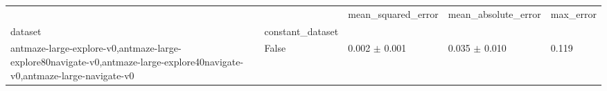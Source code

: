 \begin{tabular}{lllll}
\toprule
 &  & mean_squared_error & mean_absolute_error & max_error \\
dataset & constant_dataset &  &  &  \\
\midrule
antmaze-large-explore-v0,antmaze-large-explore80navigate-v0,antmaze-large-explore40navigate-v0,antmaze-large-navigate-v0 & False & 0.002 $\pm$ 0.001 & 0.035 $\pm$ 0.010 & 0.119 \\
\cline{1-5}
\bottomrule
\end{tabular}
